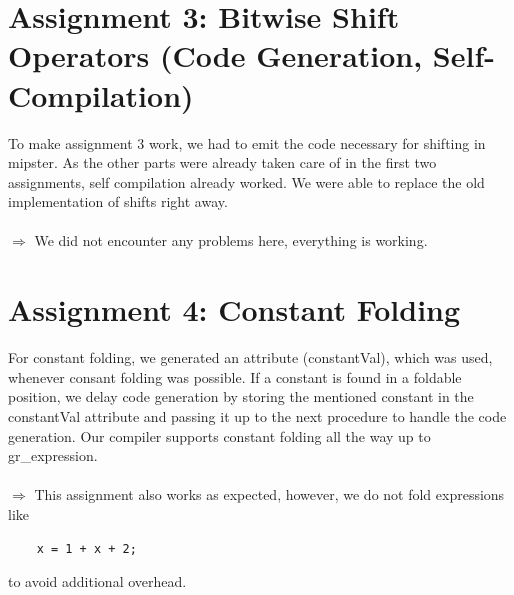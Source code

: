 \documentclass[a4paper,12pt]{article}
\begin{document}
\section{Assignment 3: Bitwise Shift Operators (Code Generation, Self-Compilation)}
To make assignment 3 work, we had to emit the code necessary for shifting in mipster. As the other parts were already taken care of in the first two assignments, self compilation already worked. We were able to replace the old implementation of shifts right away. \\\\
$\Rightarrow$ We did not encounter any problems here, everything is working. 
\newpage
\section{Assignment 4: Constant Folding} 
For constant folding, we generated an attribute (constantVal), which was used, whenever consant folding was possible. If a constant is found in a foldable position, we delay code generation by storing the mentioned constant in the constantVal attribute and passing it up to the next procedure to handle the code generation. Our compiler supports constant folding all the way up to gr\_expression. \\\\
$\Rightarrow$ This assignment also works as expected, however, we do not fold expressions like 
\begin{verbatim}
	x = 1 + x + 2;
\end{verbatim}
to avoid additional overhead.
\end{document}
